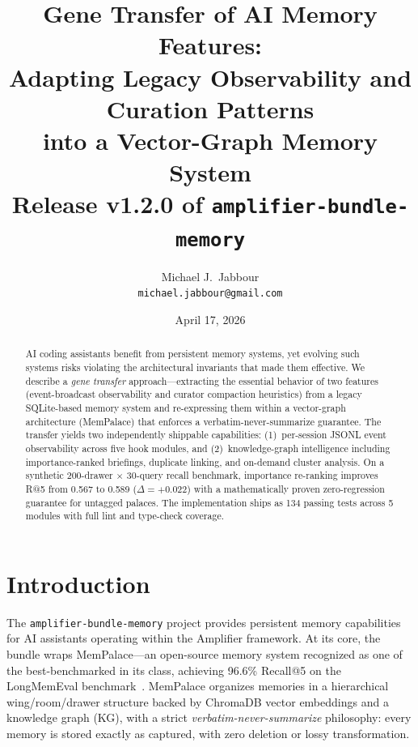 \documentclass[11pt]{article}
\title{
    \textbf{Gene Transfer of AI Memory Features:}\\[0.3em]
    \Large Adapting Legacy Observability and Curation Patterns\\
    into a Vector-Graph Memory System\\[0.8em]
    \large Release v1.2.0 of \texttt{amplifier-bundle-memory}
}
\author{Michael J.\ Jabbour \\ \texttt{michael.jabbour@gmail.com}}
\date{April 17, 2026}
\begin{document}
\maketitle

\begin{abstract}
AI coding assistants benefit from persistent memory systems, yet evolving
such systems risks violating the architectural invariants that made them
effective. We describe a \emph{gene transfer} approach---extracting the
essential behavior of two features (event-broadcast observability and
curator compaction heuristics) from a legacy SQLite-based memory system
and re-expressing them within a vector-graph architecture (MemPalace)
that enforces a verbatim-never-summarize guarantee. The transfer yields
two independently shippable capabilities: (1)~per-session JSONL event
observability across five hook modules, and (2)~knowledge-graph
intelligence including importance-ranked briefings, duplicate linking,
and on-demand cluster analysis. On a synthetic 200-drawer $\times$
30-query recall benchmark, importance re-ranking improves R@5 from 0.567
to 0.589 ($\Delta = +0.022$) with a mathematically proven zero-regression
guarantee for untagged palaces. The implementation ships as 134 passing
tests across 5 modules with full lint and type-check coverage.
\end{abstract}

\section{Introduction}

The \texttt{amplifier-bundle-memory} project provides persistent memory
capabilities for AI assistants operating within the Amplifier framework.
At its core, the bundle wraps MemPalace---an open-source memory system
recognized as one of the best-benchmarked in its class, achieving 96.6\%
Recall@5 on the LongMemEval benchmark~\cite{mempalace2026}. MemPalace
organizes memories in a hierarchical wing/room/drawer structure backed
by ChromaDB vector embeddings and a knowledge graph (KG), with a strict
\emph{verbatim-never-summarize} philosophy: every memory is stored
exactly as captured, with zero deletion or lossy transformation.
\end{document}
